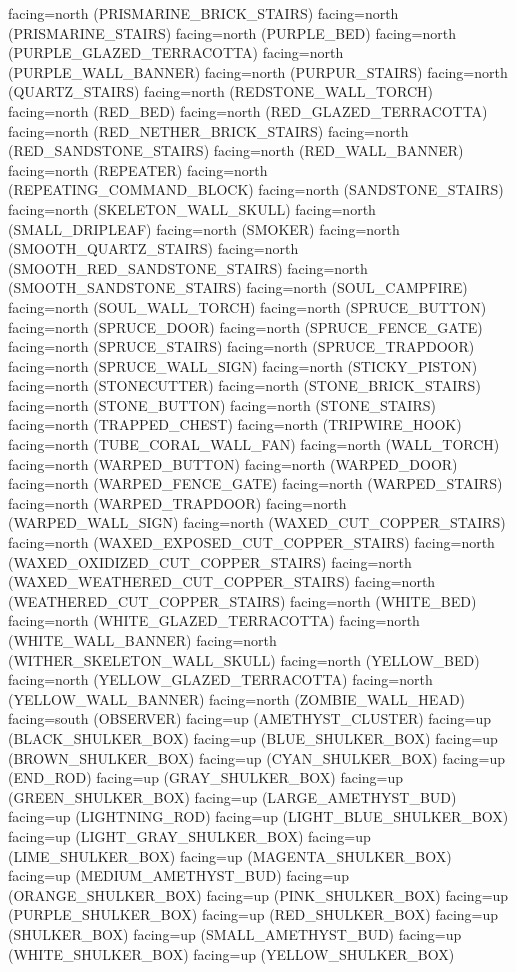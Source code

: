 \documentclass[11pt]{article}
\begin{document}
facing=north (PRISMARINE_BRICK_STAIRS)
facing=north (PRISMARINE_STAIRS)
facing=north (PURPLE_BED)
facing=north (PURPLE_GLAZED_TERRACOTTA)
facing=north (PURPLE_WALL_BANNER)
facing=north (PURPUR_STAIRS)
facing=north (QUARTZ_STAIRS)
facing=north (REDSTONE_WALL_TORCH)
facing=north (RED_BED)
facing=north (RED_GLAZED_TERRACOTTA)
facing=north (RED_NETHER_BRICK_STAIRS)
facing=north (RED_SANDSTONE_STAIRS)
facing=north (RED_WALL_BANNER)
facing=north (REPEATER)
facing=north (REPEATING_COMMAND_BLOCK)
facing=north (SANDSTONE_STAIRS)
facing=north (SKELETON_WALL_SKULL)
facing=north (SMALL_DRIPLEAF)
facing=north (SMOKER)
facing=north (SMOOTH_QUARTZ_STAIRS)
facing=north (SMOOTH_RED_SANDSTONE_STAIRS)
facing=north (SMOOTH_SANDSTONE_STAIRS)
facing=north (SOUL_CAMPFIRE)
facing=north (SOUL_WALL_TORCH)
facing=north (SPRUCE_BUTTON)
facing=north (SPRUCE_DOOR)
facing=north (SPRUCE_FENCE_GATE)
facing=north (SPRUCE_STAIRS)
facing=north (SPRUCE_TRAPDOOR)
facing=north (SPRUCE_WALL_SIGN)
facing=north (STICKY_PISTON)
facing=north (STONECUTTER)
facing=north (STONE_BRICK_STAIRS)
facing=north (STONE_BUTTON)
facing=north (STONE_STAIRS)
facing=north (TRAPPED_CHEST)
facing=north (TRIPWIRE_HOOK)
facing=north (TUBE_CORAL_WALL_FAN)
facing=north (WALL_TORCH)
facing=north (WARPED_BUTTON)
facing=north (WARPED_DOOR)
facing=north (WARPED_FENCE_GATE)
facing=north (WARPED_STAIRS)
facing=north (WARPED_TRAPDOOR)
facing=north (WARPED_WALL_SIGN)
facing=north (WAXED_CUT_COPPER_STAIRS)
facing=north (WAXED_EXPOSED_CUT_COPPER_STAIRS)
facing=north (WAXED_OXIDIZED_CUT_COPPER_STAIRS)
facing=north (WAXED_WEATHERED_CUT_COPPER_STAIRS)
facing=north (WEATHERED_CUT_COPPER_STAIRS)
facing=north (WHITE_BED)
facing=north (WHITE_GLAZED_TERRACOTTA)
facing=north (WHITE_WALL_BANNER)
facing=north (WITHER_SKELETON_WALL_SKULL)
facing=north (YELLOW_BED)
facing=north (YELLOW_GLAZED_TERRACOTTA)
facing=north (YELLOW_WALL_BANNER)
facing=north (ZOMBIE_WALL_HEAD)
facing=south (OBSERVER)
facing=up (AMETHYST_CLUSTER)
facing=up (BLACK_SHULKER_BOX)
facing=up (BLUE_SHULKER_BOX)
facing=up (BROWN_SHULKER_BOX)
facing=up (CYAN_SHULKER_BOX)
facing=up (END_ROD)
facing=up (GRAY_SHULKER_BOX)
facing=up (GREEN_SHULKER_BOX)
facing=up (LARGE_AMETHYST_BUD)
facing=up (LIGHTNING_ROD)
facing=up (LIGHT_BLUE_SHULKER_BOX)
facing=up (LIGHT_GRAY_SHULKER_BOX)
facing=up (LIME_SHULKER_BOX)
facing=up (MAGENTA_SHULKER_BOX)
facing=up (MEDIUM_AMETHYST_BUD)
facing=up (ORANGE_SHULKER_BOX)
facing=up (PINK_SHULKER_BOX)
facing=up (PURPLE_SHULKER_BOX)
facing=up (RED_SHULKER_BOX)
facing=up (SHULKER_BOX)
facing=up (SMALL_AMETHYST_BUD)
facing=up (WHITE_SHULKER_BOX)
facing=up (YELLOW_SHULKER_BOX)
\end{document}
